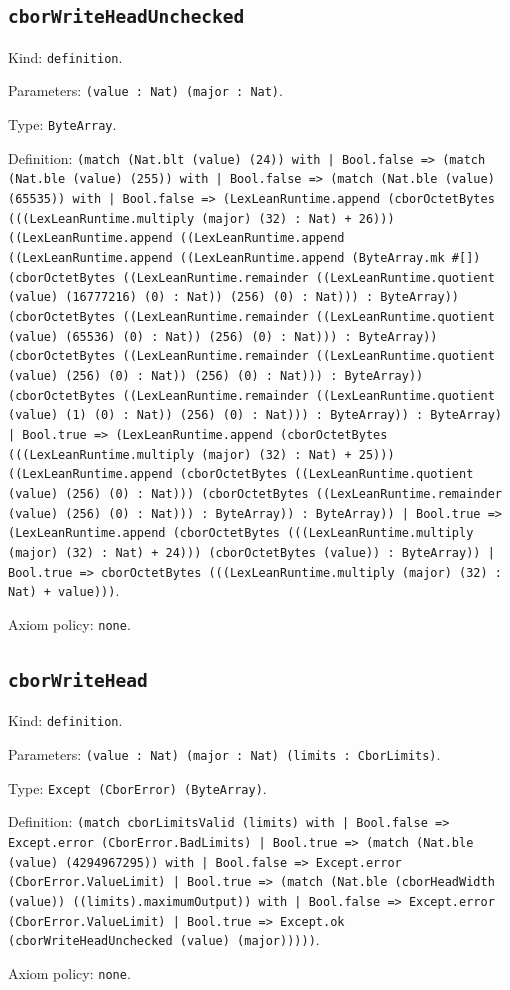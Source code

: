 \documentclass[11pt]{article}
\begin{document}
\subsection*{\texttt{cborWriteHeadUnchecked}}
\noindent Kind: \texttt{definition}.\par
\noindent Parameters: \texttt{(value : Nat) (major : Nat)}.\par
\noindent Type: \texttt{ByteArray}.\par
\noindent Definition: \texttt{(match (Nat.blt (value) (24)) with | Bool.false => (match (Nat.ble (value) (255)) with | Bool.false => (match (Nat.ble (value) (65535)) with | Bool.false => (LexLeanRuntime.append (cborOctetBytes (((LexLeanRuntime.multiply (major) (32) : Nat) + 26))) ((LexLeanRuntime.append ((LexLeanRuntime.append ((LexLeanRuntime.append ((LexLeanRuntime.append (ByteArray.mk \#[]) (cborOctetBytes ((LexLeanRuntime.remainder ((LexLeanRuntime.quotient (value) (16777216) (0) : Nat)) (256) (0) : Nat))) : ByteArray)) (cborOctetBytes ((LexLeanRuntime.remainder ((LexLeanRuntime.quotient (value) (65536) (0) : Nat)) (256) (0) : Nat))) : ByteArray)) (cborOctetBytes ((LexLeanRuntime.remainder ((LexLeanRuntime.quotient (value) (256) (0) : Nat)) (256) (0) : Nat))) : ByteArray)) (cborOctetBytes ((LexLeanRuntime.remainder ((LexLeanRuntime.quotient (value) (1) (0) : Nat)) (256) (0) : Nat))) : ByteArray)) : ByteArray) | Bool.true => (LexLeanRuntime.append (cborOctetBytes (((LexLeanRuntime.multiply (major) (32) : Nat) + 25))) ((LexLeanRuntime.append (cborOctetBytes ((LexLeanRuntime.quotient (value) (256) (0) : Nat))) (cborOctetBytes ((LexLeanRuntime.remainder (value) (256) (0) : Nat))) : ByteArray)) : ByteArray)) | Bool.true => (LexLeanRuntime.append (cborOctetBytes (((LexLeanRuntime.multiply (major) (32) : Nat) + 24))) (cborOctetBytes (value)) : ByteArray)) | Bool.true => cborOctetBytes (((LexLeanRuntime.multiply (major) (32) : Nat) + value)))}.\par
\noindent Axiom policy: \texttt{none}.\par
\subsection*{\texttt{cborWriteHead}}
\noindent Kind: \texttt{definition}.\par
\noindent Parameters: \texttt{(value : Nat) (major : Nat) (limits : CborLimits)}.\par
\noindent Type: \texttt{Except (CborError) (ByteArray)}.\par
\noindent Definition: \texttt{(match cborLimitsValid (limits) with | Bool.false => Except.error (CborError.BadLimits) | Bool.true => (match (Nat.ble (value) (4294967295)) with | Bool.false => Except.error (CborError.ValueLimit) | Bool.true => (match (Nat.ble (cborHeadWidth (value)) ((limits).maximumOutput)) with | Bool.false => Except.error (CborError.ValueLimit) | Bool.true => Except.ok (cborWriteHeadUnchecked (value) (major)))))}.\par
\noindent Axiom policy: \texttt{none}.\par
\end{document}

